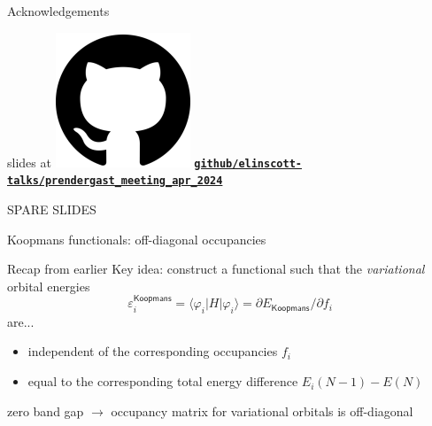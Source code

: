 \documentclass[xcolor=table,aspectratio=169]{beamer}
\newcommand{\braopket}[3]{\langle #1|#2|#3\rangle}
\newcommand{\insertframeinfo}{\insertframenumber/\inserttotalframenumber}
\newcommand{\backupbegin}{
   \newcounter{finalframe}
   \setcounter{finalframe}{\value{framenumber}}
   \renewcommand{\insertframeinfo}{}
}
\numberwithin{equation}{section}
\begin{document}
\begin{frame}{Acknowledgements}
\begin{center}
      \vspace{1em}
      slides at \includegraphics[height=\fontcharht\font`\B]{logos/github.png} \href{https://github.com/elinscott-talks/prendergast_meeting_apr_2024}{\textbf{\texttt{github/elinscott-talks/prendergast\_meeting\_apr\_2024}}}
   \end{center}

\end{frame}
\endgroup

\backupbegin
\begin{frame}{}

   \begin{center}
      \huge SPARE SLIDES
   \end{center}

\end{frame}


\begin{frame}{Koopmans functionals: off-diagonal occupancies}
   \begin{block}{Recap from earlier}
      Key idea: construct a functional such that the \emph{variational} orbital energies
      \begin{equation*}
         \varepsilon^\mathsf{Koopmans}_i = \braopket{\varphi_i}{H}{\varphi_i} = \partial E_\mathsf{Koopmans}/\partial f_i
      \end{equation*}
      are...
      \begin{itemize}
         \item independent of the corresponding occupancies $f_i$
         \item equal to the corresponding total energy difference $E_i(N-1) - E(N)$
      \end{itemize}
   \end{block}

   zero band gap $\rightarrow$ occupancy matrix for variational orbitals is off-diagonal
\end{frame}


% 
\end{document}
